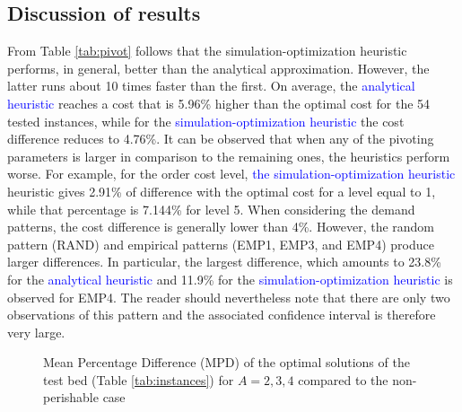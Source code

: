 \documentclass{tPRS2e}
\newcommand{\blue}{\textcolor{blue}}
\begin{document}
\subsection{Discussion of results}
\label{sec:discussion}
From Table \ref{tab:pivot} follows that the simulation-optimization heuristic performs, in general, better than the analytical approximation. However, the latter runs about 10 times faster than the first. On average, the \blue{analytical heuristic} reaches a cost that is 5.96\% higher than the optimal cost for the 54 tested instances, while for the \blue{simulation-optimization heuristic} the cost difference reduces to 4.76\%. It can be observed that when any of the pivoting parameters is larger in comparison to the remaining ones, the heuristics perform worse. For example, for the order cost level, \blue{the simulation-optimization heuristic} heuristic  gives 2.91\% of difference with the optimal cost for a level equal to 1, while that percentage is 7.144\% for level 5. When considering the demand patterns, the cost difference is generally lower than 4\%. However, the random pattern (RAND) and empirical patterns (EMP1, EMP3, and EMP4) produce larger differences. In particular, the largest difference, which amounts to 23.8\% for the \blue{analytical heuristic} and 11.9\% for the \blue{simulation-optimization heuristic} is observed for EMP4. The reader should nevertheless note that there are only two observations of this pattern and the associated confidence interval is therefore very large.

\begin{figure}[]
\centering
{}
\caption{Mean Percentage Difference (MPD) of the optimal solutions of the test bed (Table \ref{tab:instances}) for $A =2,3,4$ compared to the non-perishable case}
\label{fig:diffA}
\end{figure}
\end{document}
